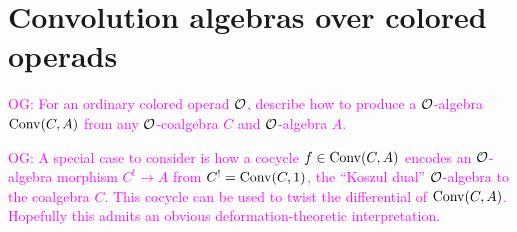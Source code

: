 \documentclass[11pt]{amsart}
\numberwithin{equation}{section}
\def\owen{\textcolor{magenta}{OG: }\textcolor{magenta}}
\def\greg{\textcolor{red}{GG: }\textcolor{red}}
\begin{document}
%
% 
%
%
%

\section{Convolution algebras over colored operads}

\def\conv{{\rm Conv}}

\owen{For an ordinary colored operad $\mathcal O$, describe how to produce a $\mathcal O$-algebra $\conv(C,A)$ from any $\mathcal O$-coalgebra $C$ and $\mathcal O$-algebra $A$.}

\owen{A special case to consider is how a cocycle $f \in \conv(C,A)$ encodes an $\mathcal O$-algebra morphism $C^! \to A$ from $C^! = \conv(C,1)$, the ``Koszul dual'' $\mathcal O$-algebra to the coalgebra $C$. This cocycle can be used to twist the differential of $\conv(C,A)$. Hopefully this admits an obvious deformation-theoretic interpretation.}
\end{document}
